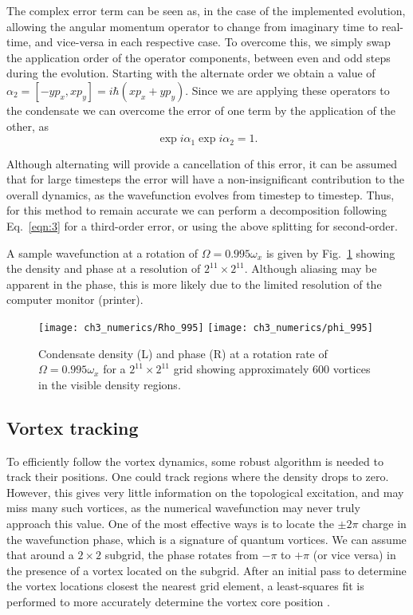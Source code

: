  The complex error term can be seen as, in the case of the implemented evolution, allowing the angular momentum operator to change from imaginary time to real-time, and vice-versa in each respective case. To overcome this, we simply swap the application order of the operator components, between even and odd steps during the evolution. Starting with the alternate order we obtain a value of $\alpha_2 = [-y p_x, x p_y] = i\hbar \left(x p_x + y p_y \right)$. Since we are applying these operators to the condensate we can overcome the error of one term by the application of the other, as
 \begin{equation}
 \exp{i \alpha_1}\exp{i \alpha_2} = 1.
 \end{equation}

 Although alternating will provide a cancellation of this error, it can be assumed that for large timesteps the error will have a non-insignificant contribution to the overall dynamics, as the wavefunction evolves from timestep to timestep. Thus, for this method to remain accurate we can perform a decomposition following Eq.~\ref{eqn:3} for a third-order error, or using the above splitting for second-order.

 A sample wavefunction at a rotation of $\Omega = 0.995\omega_x$ is given by Fig.~\ref{fig:showingoff} showing the density and phase at a resolution of $2^{11}\times 2^{11}$. Although aliasing may be apparent in the phase, this is more likely due to the limited resolution of the computer monitor (printer).

 \begin{figure}
     \centering
     \texttt{[image: ch3\_numerics/Rho\_995]}
     \texttt{[image: ch3\_numerics/phi\_995]}
     \caption{Condensate density (L) and phase (R) at a rotation rate of $\Omega=0.995\omega_x$ for a $2^{11}\times 2^{11}$ grid showing approximately 600 vortices in the visible density regions.}
     \label{fig:showingoff}
 \end{figure}

 \subsection{Vortex tracking}
 To efficiently follow the vortex dynamics, some robust algorithm is needed to track their positions. One could track regions where the density drops to zero. However, this gives very little information on the topological excitation, and may miss many such vortices, as the numerical wavefunction may never truly approach this value. One of the most effective ways is to locate the $\pm 2\pi$ charge in the wavefunction phase, which is a signature of quantum vortices. We can assume that around a $2\times 2$ subgrid, the phase rotates from $-\pi$ to $+\pi$ (or vice versa) in the presence of a vortex located on the subgrid. After an initial pass to determine the vortex locations closest the nearest grid element, a least-squares fit is performed to more accurately determine the vortex core position \cite{c42f}.

